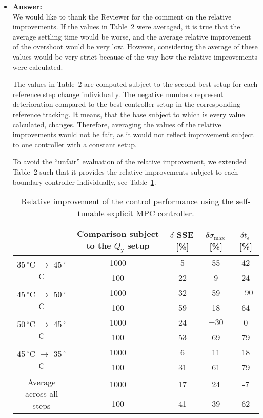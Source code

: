 \documentclass[a4paper,10pt]{article}
\newcommand{\answer}[1]{
	\begin{itemize}
		\item[] \textbf{Answer:}\\ #1
	\end{itemize}
}
\begin{document}
	\answer{
		We would like to thank the Reviewer for the comment on the relative improvements. If the values in Table~2 were averaged, it is true that the average settling time would be worse, and the average relative improvement of the overshoot would be very low. However, considering the average of these values would be very strict because of the way how the relative improvements were calculated.
		
		The values in Table~2 are computed subject to the second best setup for each reference step change individually. The negative numbers represent deterioration compared to the best controller setup in the corresponding reference tracking. It means, that the base subject to which is every value calculated, changes. Therefore, averaging the values of the relative improvements would not be fair, as it would not reflect improvement subject to one controller with a constant setup.
		
		To avoid the ``unfair'' evaluation of the relative improvement, we extended Table~2 such that it provides the relative improvements subject to each boundary controller individually, see Table~\ref{tab:improvement}.
		
		\begin{table}[h!]
			\begin{center}
				\caption{Relative improvement of the control performance using the self-tunable explicit MPC controller.}
				\label{tab:improvement}
				\begin{tabular}{c|c|c|c|c} 
					& Comparison subject to the $Q_\mathrm{y}$ setup & $\delta$ SSE\,[\%] & $\delta \sigma_{\mathrm{max}}$\,[\%] & $\delta t_{\epsilon}$\,[\%]  \\
					\hline
					\multirow{2}{*}{ 35\,$^{\circ}$C $\rightarrow$ 45\,$^{\circ}$C } & 1000 & 5 &  55 & 42 \\
					& 100 & 22 &  9 & 24 \\  
					\hline
					\multirow{2}{*}{45\,$^{\circ}$C $\rightarrow$ 50\,$^{\circ}$C } & 1000 & 32 & 59 &$-90$  \\ 
					& 100 & 59 &  18 & 64 \\ 
					\hline
					\multirow{2}{*}{50\,$^{\circ}$C $\rightarrow$ 45\,$^{\circ}$C } & 1000 & 24 &$-30$& 0 \\ 
					& 100 & 53 & 69 & 79 \\
					\hline
					\multirow{2}{*}{45\,$^{\circ}$C $\rightarrow$ 35\,$^{\circ}$C } &  1000 & 6 & 11 & 18 \\
					& 100 & 31 &  61 & 79 \\
					\hline
					\multirow{2}{*}{Average across all steps} &  1000 & 17 & 24 & -7 \\
					& 100 & 41 &  39 & 62  
				\end{tabular}
			\end{center}
		\end{table}
	}
	
\end{document}
